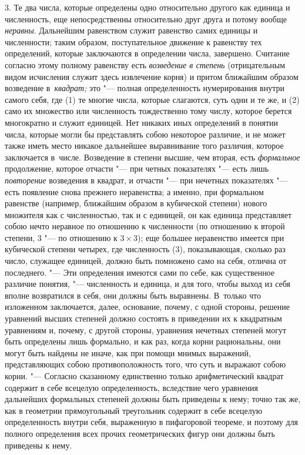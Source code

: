 3. Те два числа, которые определены одно относительно другого как единица и
численность, еще непосредственны относительно друг друга и потому вообще {\em
неравны}. Дальнейшим равенством служит равенство самих единицы и численности;
таким образом, поступательное движение к равенству тех определений, которые
заключаются в определении числа, завершено. Считание согласно этому полному
равенству есть {\em возведение в степень} (отрицательным видом исчисления
служит здесь извлечение корня) и притом ближайшим образом возведение
в~{\em квадрат;} это "--- полная определенность нумерирования внутри самого
себя, где (1) те многие числа, которые слагаются, суть одни и те же, и (2) само
их множество или численность тождественно тому числу, которое берется
многократно и служит единицей. Нет никаких иных определений в понятии числа,
которые могли бы представлять собою некоторое различие, и не может также иметь
место никакое дальнейшее выравнивание того различия, которое заключается
в~числе. Возведение в степени высшие, чем вторая, есть {\em формальное}
продолжение, которое отчасти "--- при четных показателях "--- есть лишь
{\em повторение} возведения в квадрат, и отчасти "--- при нечетных показателях
"--- есть появление снова прежнего неравенства; а именно, при формальном
равенстве (например, ближайшим образом в кубической степени) нового множителя
как с численностью, так и с единицей, он как единица представляет собою нечто
неравное по отношению к численности (по отношению к второй степени, 3 "--- по
отношению к $3\times 3$); еще большее неравенство имеется при кубической
степени четырех, где численность (3), показывающая, сколько раз число, служащее
единицей, должно быть помножено само на себя, отлична от последнего. "--- Эти
определения имеются сами по себе, как существенное различие понятия, "---
численность и единица, и для того, чтобы выход из себя вполне возвратился в
себя, они должны быть выравнены. В~только что изложенном заключается, далее,
основание, почему, с одной стороны, решение уравнений высших степеней должно
состоять в приведении их к квадратным уравнениям и, почему, с другой стороны,
уравнения нечетных степеней могут быть определены лишь формально, и как раз,
когда корни рациональны, они могут быть найдены не иначе, как при помощи мнимых
выражений, представляющих собою противоположность того, что суть и выражают
собою корни. "--- Согласно сказанному единственно только арифметический квадрат
содержит в себе всецелую определенность, вследствие чего уравнения дальнейших
формальных степеней должны быть приведены к нему; точно так же, как в геометрии
прямоугольный треугольник содержит в себе всецелую определенность внутри себя,
выраженную в пифагоровой теореме, и поэтому для полного определения всех прочих
геометрических фигур они должны быть приведены к нему.

